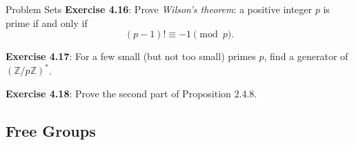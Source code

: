 \documentclass{report}
\begin{document}
\begin{exercises}{Problem Sets}
    \textbf{Exercise 4.16}: Prove \textit{Wilson's theorem}: a positive integer $p$ is prime if and only if
        \begin{equation*}
            (p - 1)! \equiv -1 \pmod{p}.
        \end{equation*}

    \textbf{Exercise 4.17}: For a few small (but not too small) primes $p$, find a generator of $(\mathbb{Z}/p\mathbb{Z})^{*}$.

    \textbf{Exercise 4.18}: Prove the second part of Proposition 2.4.8.
\end{exercises}

\begin{topic}
    \section{Free Groups}
\end{topic}
\end{document}
